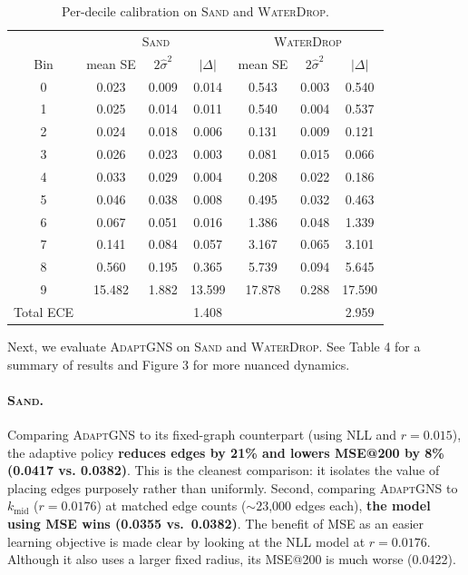 \documentclass{article}
\begin{document}
\begin{table}[H]
  \caption{Per-decile calibration on \textsc{Sand} and \textsc{WaterDrop}.}
  \label{tab:calibration_sand_wd}
  \centering
  \footnotesize
  \begin{tabular}{c|ccc|ccc}
    \toprule
    & \multicolumn{3}{c|}{\textsc{Sand}} & \multicolumn{3}{c}{\textsc{WaterDrop}} \\
    Bin & mean SE & $2\hat{\sigma}^2$ & $|\Delta|$ & mean SE & $2\hat{\sigma}^2$ & $|\Delta|$ \\
    \midrule
    0 & 0.023 & 0.009 & 0.014 & 0.543 & 0.003 & 0.540 \\
    1 & 0.025 & 0.014 & 0.011 & 0.540 & 0.004 & 0.537 \\
    2 & 0.024 & 0.018 & 0.006 & 0.131 & 0.009 & 0.121 \\
    3 & 0.026 & 0.023 & 0.003 & 0.081 & 0.015 & 0.066 \\
    4 & 0.033 & 0.029 & 0.004 & 0.208 & 0.022 & 0.186 \\
    5 & 0.046 & 0.038 & 0.008 & 0.495 & 0.032 & 0.463 \\
    6 & 0.067 & 0.051 & 0.016 & 1.386 & 0.048 & 1.339 \\
    7 & 0.141 & 0.084 & 0.057 & 3.167 & 0.065 & 3.101 \\
    8 & 0.560 & 0.195 & 0.365 & 5.739 & 0.094 & 5.645 \\
    9 & 15.482 & 1.882 & 13.599 & 17.878 & 0.288 & 17.590 \\
    \midrule
    \multicolumn{1}{l}{Total ECE} & & & 1.408 & & & 2.959 \\
    \bottomrule
  \end{tabular}
\end{table}

Next, we evaluate \textsc{AdaptGNS} on \textsc{Sand} and \textsc{WaterDrop}. See Table 4 for a summary of results and Figure 3 for more nuanced dynamics.

\paragraph{\textsc{Sand}.} Comparing \textsc{AdaptGNS} to its fixed-graph counterpart (using NLL and $r = 0.015$), the adaptive policy \textbf{reduces edges by 21\% and
lowers MSE@200 by 8\% (0.0417 vs. 0.0382)}.
This is the cleanest comparison: it isolates the value of placing edges
purposely rather than uniformly.
Second, comparing \textsc{AdaptGNS} to $k_\text{mid}$ ($r = 0.0176$) at matched edge counts
(${\sim}23$,000 edges each), \textbf{the model using MSE wins (0.0355 vs.\ 0.0382)}. The benefit of MSE as an easier learning objective is made clear by looking at the NLL model at $r = 0.0176$. Although it also uses a larger fixed radius, its MSE@200 is much worse (0.0422).
\end{document}
